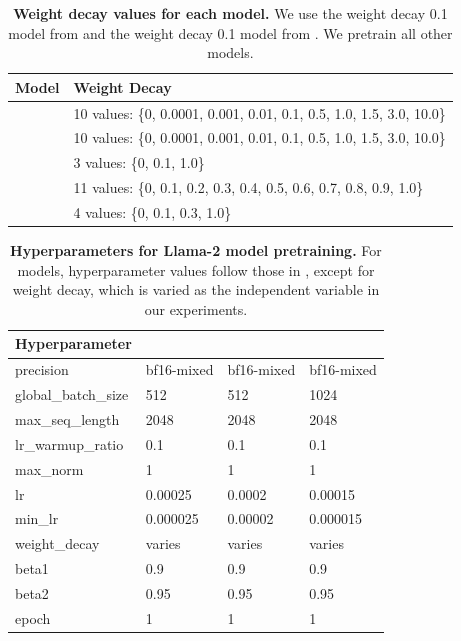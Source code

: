 \renewcommand{\arraystretch}{1.2} 
\begin{table}[H]
\centering
\begin{tabular}{ll}
\hline
\textbf{Model} & \textbf{Weight Decay} \\ \hline
\llamazeropointfiveB{} & 10 values: \{0, 0.0001, 0.001, 0.01, 0.1, 0.5, 1.0, 1.5, 3.0, 10.0\} \\
\llamaoneB{}           & 10 values: \{0, 0.0001, 0.001, 0.01, 0.1, 0.5, 1.0, 1.5, 3.0, 10.0\}  \\
\llamafourB{}          & 3 values: \{0, 0.1, 1.0\}              \\
\olmoonex{}            & 11 values: \{0, 0.1, 0.2, 0.3, 0.4, 0.5, 0.6, 0.7, 0.8, 0.9, 1.0\}               \\
\olmosevenx{}          & 4 values: \{0, 0.1, 0.3, 1.0\}                \\ \hline
\end{tabular}
\vspace{0.2cm}
\caption{\textbf{Weight decay values for each model.} We use the \llamafourB{} weight decay 0.1 model from \citet{qi2025evolm} and the \olmosevenx{} weight decay 0.1 model from \citet{bordt2025train}. We pretrain all other models.}
\label{table:wd}
\end{table}



\begin{table}[H]
\centering
\begin{tabular}{llll}
\hline
\textbf{Hyperparameter } & \textbf{\llamazeropointfiveB{}} & \textbf{\llamaoneB{}} & \textbf{\llamafourB{}}  \\ \hline
precision           & bf16-mixed & bf16-mixed & bf16-mixed  \\
global\_batch\_size & 512     & 512     & 1024        \\
max\_seq\_length    & 2048    & 2048    & 2048        \\
lr\_warmup\_ratio   & 0.1     & 0.1     & 0.1          \\
max\_norm           & 1       & 1       & 1            \\
lr                  & 0.00025  & 0.0002  & 0.00015   \\
min\_lr             & 0.000025 & 0.00002 & 0.000015  \\
weight\_decay       & varies   & varies  & varies    \\
beta1               & 0.9      & 0.9     & 0.9         \\
beta2               & 0.95     & 0.95    & 0.95       \\
epoch               & 1        & 1       & 1             \\ \hline
\end{tabular}
\vspace{0.2cm}
\caption{\textbf{Hyperparameters for Llama-2 model pretraining.} For \llama{} models, hyperparameter values follow those in \citet{qi2025evolm}, except for weight decay, which is varied as the independent variable in our experiments.}
\label{table:pt-hyperparams-llama}
\end{table}



